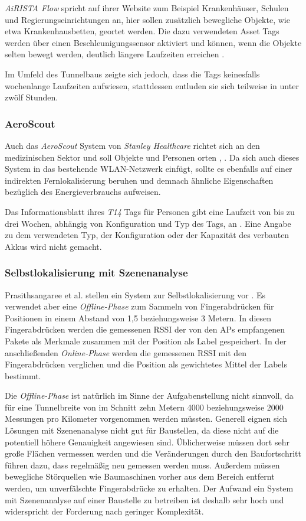 \emph{AiRISTA Flow} spricht auf ihrer Website zum Beispiel Krankenhäuser, Schulen und Regierungseinrichtungen an, hier sollen zusätzlich bewegliche Objekte, wie etwa Krankenhausbetten, geortet werden.
Die dazu verwendeten Asset Tags werden über einen Beschleunigungssensor aktiviert und können, wenn die Objekte selten bewegt werden, deutlich längere Laufzeiten erreichen \cite{ekahau2017a4}. 

Im Umfeld des Tunnelbaus zeigte sich jedoch, dass die Tags keinesfalls wochenlange Laufzeiten aufwiesen, stattdessen entluden sie sich teilweise in unter zwölf Stunden.

\subsubsection{AeroScout}
Auch das \emph{AeroScout} System von \emph{Stanley Healthcare} richtet sich an den medizinischen Sektor und soll Objekte und Personen orten \cite{aeroscout2017asset}, \cite{aeroscout2017staff}.
Da sich auch dieses System in das bestehende WLAN-Netzwerk einfügt, sollte es ebenfalls auf einer indirekten Fernlokalisierung beruhen und demnach ähnliche Eigenschaften bezüglich des Energieverbrauchs aufweisen.

Das Informationsblatt ihres \emph{T14} Tags für Personen gibt eine Laufzeit von bis zu drei Wochen, abhängig von Konfiguration und Typ des Tags, an \cite{aeroscout2017t14}. 
Eine Angabe zu dem verwendeten Typ, der Konfiguration oder der Kapazität des verbauten Akkus wird nicht gemacht.

\subsubsection{Selbstlokalisierung mit Szenenanalyse}
\label{ch:Vorherige:sec:RSS-basierte}
Prasithsangaree et al. stellen ein System zur Selbstlokalisierung vor \cite{prasithsangaree2002indoor}. 
Es verwendet aber eine \emph{Offline-Phase} zum Sammeln von Fingerabdrücken für Positionen in einem Abstand von 1,5 beziehungsweise 3 Metern. 
In diesen Fingerabdrücken werden die gemessenen RSSI der von den APs empfangenen Pakete als Merkmale zusammen mit der Position als Label gespeichert.
In der anschließenden \emph{Online-Phase} werden die gemessenen RSSI mit den Fingerabdrücken verglichen und die Position als gewichtetes Mittel der Labels bestimmt. 

Die \emph{Offline-Phase} ist natürlich im Sinne der Aufgabenstellung nicht sinnvoll, da für eine Tunnelbreite von im Schnitt zehn Metern 4000 beziehungsweise 2000 Messungen pro Kilometer vorgenommen werden müssten.
Generell eignen sich Lösungen mit Szenenanalyse nicht gut für Baustellen, da diese nicht auf die potentiell höhere Genauigkeit angewiesen sind. 
Üblicherweise müssen dort sehr große Flächen vermessen werden und die Veränderungen durch den Baufortschritt führen dazu, dass regelmäßig neu gemessen werden muss.
Außerdem müssen bewegliche Störquellen wie Baumaschinen vorher aus dem Bereich entfernt werden, um unverfälschte Fingerabdrücke zu erhalten.
Der Aufwand ein System mit Szenenanalyse auf einer Baustelle zu betreiben ist deshalb sehr hoch und widerspricht der Forderung nach geringer Komplexität. 

